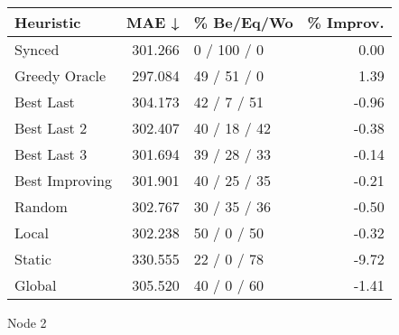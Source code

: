 \begin{tabular}{lrlr}
\toprule
\textbf{Heuristic} & \textbf{MAE ↓} & \textbf{\% Be/Eq/Wo} & \textbf{\% Improv.} \\
\midrule
            Synced &        301.266 &          0 / 100 / 0 &                0.00 \\
     Greedy Oracle &        297.084 &          49 / 51 / 0 &                1.39 \\
         Best Last &        304.173 &          42 / 7 / 51 &               -0.96 \\
       Best Last 2 &        302.407 &         40 / 18 / 42 &               -0.38 \\
       Best Last 3 &        301.694 &         39 / 28 / 33 &               -0.14 \\
    Best Improving &        301.901 &         40 / 25 / 35 &               -0.21 \\
            Random &        302.767 &         30 / 35 / 36 &               -0.50 \\
             Local &        302.238 &          50 / 0 / 50 &               -0.32 \\
            Static &        330.555 &          22 / 0 / 78 &               -9.72 \\
            Global &        305.520 &          40 / 0 / 60 &               -1.41 \\
\bottomrule
\end{tabular}
\caption{Node 2}
\label{tab:non_lr05_le2_bs4_2}
